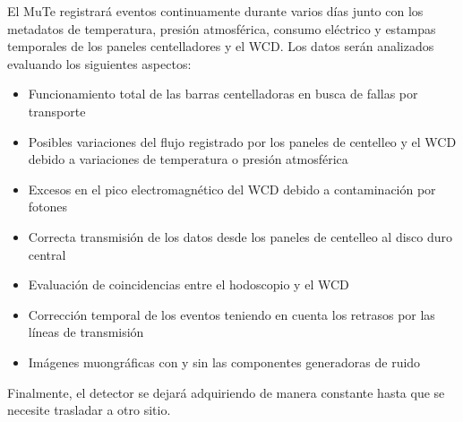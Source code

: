 El MuTe registrará eventos continuamente durante varios días junto con los metadatos de temperatura, presión atmosférica, consumo eléctrico y estampas temporales de los paneles centelladores y el WCD. Los datos serán analizados evaluando los siguientes aspectos:

\begin{itemize}
    \item Funcionamiento total de las barras centelladoras en busca de fallas por transporte
    \item Posibles variaciones del flujo registrado por los paneles de centelleo y el WCD debido a variaciones de temperatura o presión atmosférica
    \item Excesos en el pico electromagnético del WCD debido a contaminación por fotones
    \item Correcta transmisión de los datos desde los paneles de centelleo al disco duro central
    \item Evaluación de coincidencias entre el hodoscopio y el WCD
    \item Corrección temporal de los eventos teniendo en cuenta los retrasos por las líneas de transmisión
    \item Imágenes muongráficas con y sin las componentes generadoras de ruido
    
\end{itemize}

Finalmente, el detector se dejará adquiriendo de manera constante hasta que se necesite trasladar a otro sitio.
